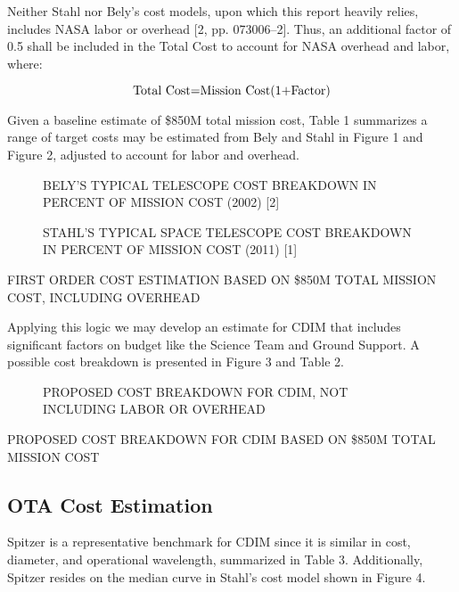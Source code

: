 \documentclass{ws-jai}
\begin{document}
Neither Stahl nor Bely's cost models, upon which this report heavily relies, includes NASA labor or overhead [2, pp. 073006--2].
Thus, an additional factor of 0.5 shall be included in the Total Cost to account for NASA overhead and labor, where:

\begin{equation}
  	$Total Cost$=$Mission Cost$ (1+$Factor$)
\end{equation}

Given a baseline estimate of \$850M total mission cost, Table 1 summarizes a range of target costs may be estimated from Bely and Stahl in Figure 1 and Figure 2, adjusted to account for labor and overhead.

\begin{figure}
  \caption{BELY'S TYPICAL TELESCOPE COST BREAKDOWN IN PERCENT OF MISSION COST (2002) [2]
\label{fig:bely-cost}
}
\end{figure}

\begin{figure}
  \caption{STAHL'S TYPICAL SPACE TELESCOPE COST BREAKDOWN IN PERCENT OF MISSION COST (2011) [1]
\label{fig:stahl-mission-cost}
}
\end{figure}

\begin{table}
  \caption{FIRST ORDER COST ESTIMATION BASED ON \$850M TOTAL MISSION COST, INCLUDING OVERHEAD
\label{tab:first-order-cost-estimate}
}
\end{table}

Applying this logic we may develop an estimate for CDIM that includes significant factors on budget like the Science Team and Ground Support.
A possible cost breakdown is presented in Figure 3 and Table 2.

\begin{figure}
  \caption{PROPOSED COST BREAKDOWN FOR CDIM, NOT INCLUDING LABOR OR OVERHEAD
\label{fig:cost-no-overhead}
}
\end{figure}

\begin{table}
  \caption{PROPOSED COST BREAKDOWN FOR CDIM BASED ON \$850M TOTAL MISSION COST
\label{tab:cost-from-total-mission}
}
\end{table}

\subsection{OTA Cost Estimation}
Spitzer is a representative benchmark for CDIM since it is similar in cost, diameter, and operational wavelength, summarized in Table 3.
Additionally, Spitzer resides on the median curve in Stahl's cost model shown in Figure 4.
\end{document}
